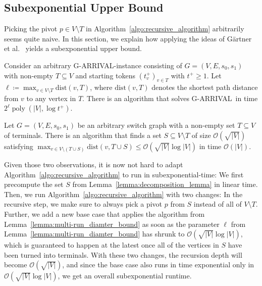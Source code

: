 \documentclass[a4paper,UKenglish,cleveref, autoref, thm-restate]{lipics-v2021}
\newcommand{\bigO}{\mathcal{O}}
\DeclareMathOperator{\poly}{poly}
\newcommand{\problem}[1]{\textrm{#1}}
\newcommand{\garrival}{\problem{G-ARRIVAL}}
\begin{document}
\subsection{Subexponential Upper Bound}
\label{ssec:subexponential_algo}

Picking the pivot $p \in V \setminus T$ in Algorithm~\ref{algo:recursive_algorithm} arbitrarily seems quite naive. In this section, we explain how applying the ideas of Gärtner et al.\@~\cite{gartnerSubexponentialAlgorithmARRIVAL2021} yields a subexponential upper bound.

\begin{lemma}
\label{lemma:multi-run_diamter_bound}
    Consider an arbitrary \garrival-instance consisting of $G = (V, E, s_0, s_1)$ with non-empty $T \subseteq V$ and starting tokens $(t^+_v)_{v \in T}$ with $t^+ \geq 1$. Let $\ell \coloneqq \max_{v \in V \setminus T} \text{dist}(v, T)$, where $\text{dist}(v, T)$ denotes the shortest path distance from $v$ to any vertex in $T$. There is an algorithm that solves \garrival\ in time $2^\ell \poly(|V|, \log t^+)$. 
\end{lemma}

\begin{lemma}
\label{lemma:decomposition_lemma}
    Let $G = (V, E, s_0, s_1)$ be an arbitrary switch graph with a non-empty set $T \subseteq V$ of terminals. There is an algorithm that finds a set $S \subseteq V \setminus T$ of size $\bigO(\sqrt{|V|})$ satisfying $\max_{v \in V \setminus (T \cup S)} \text{dist}(v, T \cup S) \leq \bigO(\sqrt{|V|} \log |V|)$ in time $\bigO(|V|)$.
\end{lemma}

Given those two observations, it is now not hard to adapt Algorithm~\ref{algo:recursive_algorithm} to run in subexponential-time: We first precompute the set $S$ from Lemma~\ref{lemma:decomposition_lemma} in linear time. Then, we run Algorithm~\ref{algo:recursive_algorithm} with two changes: In the recursive step, we make sure to always pick a pivot $p$ from $S$ instead of all of $V \setminus T$. Further, we add a new base case that applies the algorithm from Lemma~\ref{lemma:multi-run_diamter_bound} as soon as the parameter $\ell$ from Lemma~\ref{lemma:multi-run_diamter_bound} has shrunk to $\bigO(\sqrt{|V|} \log |V|)$, which is guaranteed to happen at the latest once all of the vertices in $S$ have been turned into terminals. With these two changes, the recursion depth will become $\bigO(\sqrt{|V|})$, and since the base case also runs in time exponential only in $\bigO(\sqrt{|V|} \log |V|)$, we get an overall subexponential runtime. 
\end{document}
